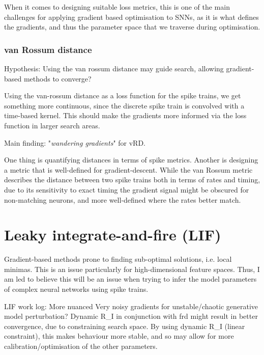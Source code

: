 \documentclass[mphil,deptreport,ai]{infthesis} %
\begin{document}
When it comes to designing suitable loss metrics, this is one of the main challenges for applying gradient based optimisation to SNNs, as it is what defines the gradients, and thus the parameter space that we traverse during optimisation.



\subsubsection{van Rossum distance}
Hypothesis: Using the van rossum distance may guide search, allowing gradient-based methods to converge?

Using the van-rossum distance as a loss function for the spike trains, we get something more continuous, since the discrete spike train is convolved with a time-based kernel. 
This should make the gradients more informed via the loss function in larger search areas.


Main finding: 
"\textit{wandering gradients}" for vRD.

One thing is quantifying distances in terms of spike metrics.
Another is designing a metric that is well-defined for gradient-descent.
While the van Rossum metric describes the distance between two spike trains both in terms of rates and timing, due to its sensitivity to exact timing the gradient signal might be obscured for non-matching neurons, and more well-defined where the rates better match.


\section{Leaky integrate-and-fire (LIF)}

Gradient-based methods prone to finding sub-optimal solutions, i.e. local minimas. This is an issue particularly for high-dimensional feature spaces. Thus, I am led to believe this will be an issue when trying to infer the model parameters of complex neural networks using spike trains.

LIF work log:
More nuanced
Very noisy gradients for unstable/chaotic generative model perturbation?
Dynamic R\_I in conjunction with frd might result in better convergence, due to constraining search space.
By using dynamic R\_I (linear constraint), this makes behaviour more stable, and so may allow for more calibration/optimisation of the other parameters.
\end{document}
